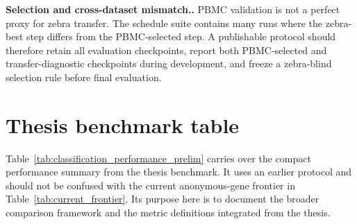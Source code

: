 \documentclass{article}
\newcommand{\myparagraph}[1]{\noindent\textbf{#1.} }
\begin{document}
\myparagraph{Selection and cross-dataset mismatch.}
PBMC validation is not a perfect proxy for zebra transfer. The schedule suite contains many runs where the zebra-best step differs from the PBMC-selected step. A publishable protocol should therefore retain all evaluation checkpoints, report both PBMC-selected and transfer-diagnostic checkpoints during development, and freeze a zebra-blind selection rule before final evaluation.

\section{Thesis benchmark table}

Table~\ref{tab:classification_performance_prelim} carries over the compact performance summary from the thesis benchmark. It uses an earlier protocol and should not be confused with the current anonymous-gene frontier in Table~\ref{tab:current_frontier}. Its purpose here is to document the broader comparison framework and the metric definitions integrated from the thesis.
\end{document}
